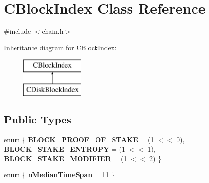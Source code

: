 \hypertarget{class_c_block_index}{}\section{C\+Block\+Index Class Reference}
\label{class_c_block_index}


{\ttfamily \#include $<$chain.\+h$>$}

Inheritance diagram for C\+Block\+Index\+:\begin{figure}[H]
\begin{center}
\leavevmode
\includegraphics[height=2.000000cm]{class_c_block_index}
\end{center}
\end{figure}
\subsection*{Public Types}
\begin{DoxyCompactItemize}
\item 
\mbox{\label{class_c_block_index_aa518b1ab90f8a0bb1df29da6063d886b}} 
enum \{ {\bfseries B\+L\+O\+C\+K\+\_\+\+P\+R\+O\+O\+F\+\_\+\+O\+F\+\_\+\+S\+T\+A\+KE} = (1 $<$$<$ 0), 
{\bfseries B\+L\+O\+C\+K\+\_\+\+S\+T\+A\+K\+E\+\_\+\+E\+N\+T\+R\+O\+PY} = (1 $<$$<$ 1), 
{\bfseries B\+L\+O\+C\+K\+\_\+\+S\+T\+A\+K\+E\+\_\+\+M\+O\+D\+I\+F\+I\+ER} = (1 $<$$<$ 2)
 \}
\item 
\mbox{\label{class_c_block_index_acefc16035e60d7bd52ed2c9bb1aa838e}} 
enum \{ {\bfseries n\+Median\+Time\+Span} = 11
 \}
\end{DoxyCompactItemize}
